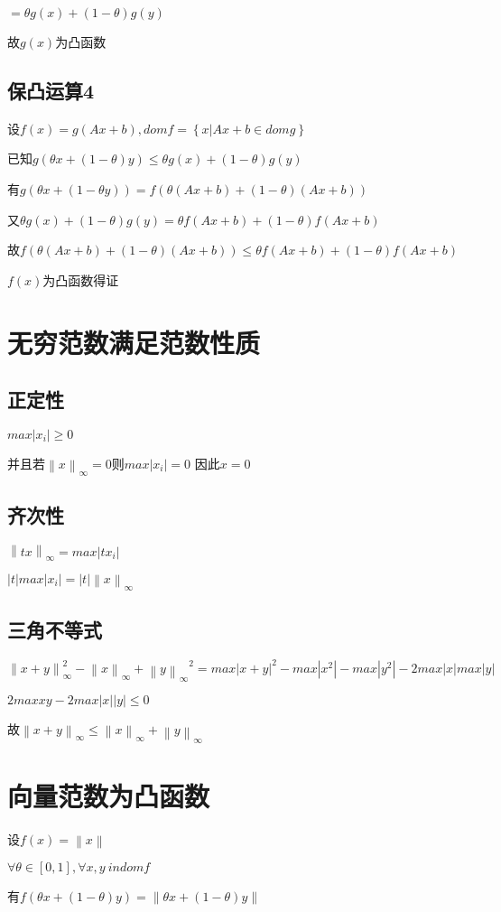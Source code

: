 \documentclass[12pt, a4paper, oneside, fontset=windows]{ctexart}
\begin{document}
$= \theta g(x) + (1-\theta) g(y)$

故$g(x)$为凸函数
\subsection{保凸运算4}
设$f(x) = g(Ax+b), dom f = \left \{ x|Ax+b \in dom g \right \}$

已知$g(\theta x + (1-\theta)y) \leq \theta g(x) + (1-\theta)g(y)$

有$g(\theta x + (1-\theta y)) = f(\theta (Ax+b)+ (1-\theta)(Ax+b))$

又$\theta g(x) + (1-\theta)g(y) = \theta f(Ax+b) + (1-\theta)f(Ax+b)$

故$f(\theta (Ax+b)+ (1-\theta)(Ax+b)) \leq \theta f(Ax+b) + (1-\theta)f(Ax+b)$

$f(x)$为凸函数得证
\section{无穷范数满足范数性质}
\subsection{正定性}
$max|x_{i}| \geq 0$

并且若$\left \| x \right \|_{\infty } = 0$则$max|x_{i}| = 0$
因此$x = 0$
\subsection{齐次性}
$\left \| tx \right \|_{\infty } = max|tx_{i}|$

$|t|max|x_{i}| = |t|\left \| x \right \|_{\infty }$
\subsection{三角不等式}
${\left \| x+y \right \|_{\infty }^{2} - {\left \| x \right \|_{\infty } + \left \| y \right \|_{\infty }}^{2}} = {max|x+y|}^{2} - max|x^{2}| - max|y^{2}| - 2max|x|max|y|$

$2maxxy - 2max|x||y| \leq 0$

故$\left \| x+y \right \|_{\infty } \leq \left \| x \right \|_{\infty } + \left \| y \right \|_{\infty }$
\section{向量范数为凸函数}
设$f(x) = \left \| x \right \|$

$\forall \theta \in [0,1], \forall x,y \ in dom f$

有$f(\theta x + (1-\theta )y)  = \left \| \theta x +(1-\theta )y \right \|$
\end{document}
